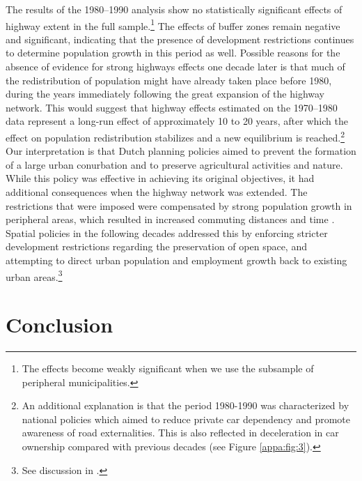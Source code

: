 \documentclass[a4paper,authoryear,review]{elsarticle}  	%
\begin{document}
	The results of the 1980--1990 analysis show no statistically significant effects of highway extent in the full sample.\footnote{The effects become weakly significant when we use the subsample of peripheral municipalities.} The effects of buffer zones remain negative and significant, indicating that the presence of development restrictions continues to determine population growth in this period as well.	
	Possible reasons for the absence of evidence for strong highways effects one decade later is that much of the redistribution of population might have already taken place before 1980, during the years immediately following the great expansion of the highway network. This would suggest that highway effects estimated on the 1970--1980 data represent a long-run effect of approximately 10 to 20 years, after which the effect on population redistribution stabilizes and a new equilibrium is reached.\footnote{An additional explanation is that the period 1980-1990 was characterized by national policies which aimed to reduce private car dependency and promote awareness of road externalities. This is also reflected in deceleration in car ownership compared with previous decades (see Figure \ref{appa:fig:3}).}
	Our interpretation is that Dutch planning policies aimed to prevent the formation of a large urban conurbation and to preserve agricultural activities and nature. While this policy was effective in achieving its original objectives, it had additional consequences when the highway network was extended. The restrictions that were imposed were compensated by strong population growth in peripheral areas, which resulted in increased commuting distances and time \citep{Cheshire2018,Schwanen2001,Schwanen2004}. Spatial policies in the following decades addressed this by enforcing stricter development restrictions regarding the preservation of open space, and attempting to direct urban population and employment growth back to existing urban areas.\footnote{See discussion in \citet{Dieleman1999a,Geurs2006a}.}

\section{Conclusion}
\end{document}
